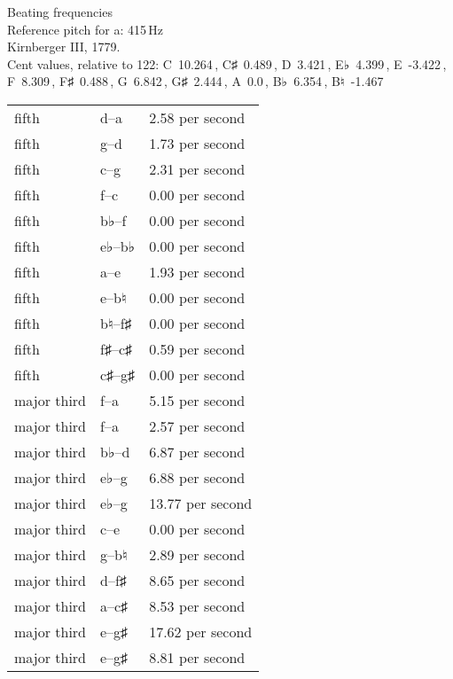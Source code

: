 \documentclass{standalone}
\def\str{\textquotesingle}
\def\cn{\textcent}
\begin{document}
\begin{minipage}{8cm}
\begin{center}
  {\Large Beating frequencies}\\[2ex]
  Reference pitch for a\str: 415\,Hz\\[1ex]
  Kirnberger III, 1779.\\[1ex]
  Cent values, relative to 122: C~10.264\,\cn, C♯~0.489\,\cn, D~3.421\,\cn, E♭~4.399\,\cn, E~-3.422\,\cn, F~8.309\,\cn, F♯~0.488\,\cn, G~6.842\,\cn, G♯~2.444\,\cn, A~0.0\,\cn, B♭~6.354\,\cn, B♮~-1.467\,\cn
\end{center}
\begin{longtable}{p{2cm}p{1cm}p{3cm}}
  \toprule
  fifth & d\str--a\str & 2.58 per second \\fifth & g--d\str & 1.73 per second \\fifth & c\str--g\str & 2.31 per second \\fifth & f--c\str & 0.00 per second \\fifth & b♭--f\str & 0.00 per second \\fifth & e♭--b♭ & 0.00 per second \\fifth & a--e\str & 1.93 per second \\fifth & e--b♮ & 0.00 per second \\fifth & b♮--f♯\str & 0.00 per second \\fifth & f♯--c♯\str & 0.59 per second \\fifth & c♯\str--g♯\str & 0.00 per second \\major third & f\str--a\str & 5.15 per second \\major third & f--a & 2.57 per second \\major third & b♭--d\str & 6.87 per second \\major third & e♭--g & 6.88 per second \\major third & e♭\str--g\str & 13.77 per second \\major third & c\str--e\str & 0.00 per second \\major third & g--b♮ & 2.89 per second \\major third & d\str--f♯\str & 8.65 per second \\major third & a--c♯\str & 8.53 per second \\major third & e\str--g♯\str & 17.62 per second \\major third & e--g♯ & 8.81 per second \\
  \bottomrule
\end{longtable}
\end{minipage}
\end{document}

